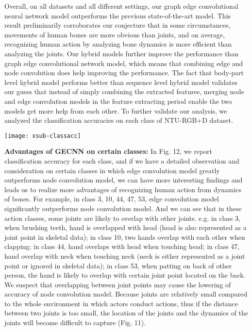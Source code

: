 \documentclass[a4paper,11pt]{article}
\begin{document}
Overall, on all datasets and all different settings, our graph edge convolutional neural network model outperforms the previous state-of-the-art model.
This result preliminarily corroborates our conjecture that in some circumstances, movements of human bones are more obvious than joints, and on average, recognizing human action by analyzing bone dynamics is more efficient than analyzing the joints. Our hybrid models further improve the performance than graph edge convolutional network model, which means that combining edge and node convolution does help improving the performance. The fact that body-part level hybrid model performs better than sequence level hybrid model validates our guess that instead of simply combining the extracted features, merging node and edge convolution models in the feature extracting period enable the two models get more help from each other.
To further validate our analysis, we analyzed the classification accuracies on each class of NTU-RGB+D dataset.

\begin{figure*}
\centering
\texttt{[image: xsub-classacc]}
\caption{Class accuracy on NTU-RGB+D dataset with cross-subject separation. For each class, we represent the accuracies of four models with bars in four different colors. We only provide the number denoting each class, for detailed name of each class, please refer to \href{https://github.com/shahroudy/NTURGB-D}{NTU-RGB+D}}
\label{fig:example}
\end{figure*}



{\bf Advantages of GECNN on certain classes:}
In Fig. 12, we report classification accuracy for each class, and if we have a detailed observation and consideration on certain classes in which edge convolution model greatly outperforms node convolution model, we can have more interesting findings and leads us to realize more advantages of recognizing human action from dynamics of bones. For example, in class 3, 10, 44, 47, 53, edge convolution model significantly outperforms node convolution model. And we can see that in these action classes, some joints are likely to overlap with other joints. e.g. in class 3, when brushing teeth, hand is overlapped with head (head is also represented as a joint point in skeletal data); in class 10, two hands overlap with each other when clapping; in class 44, hand overlaps with head when touching head; in class 47, hand overlap with neck when touching neck (neck is either represented as a joint point or ignored in skeletal data); in class 53, when patting on back of other person, the hand is likely to overlap with certain joint point located on the back. We suspect that overlapping between joint points may cause the lowering of accuracy of node convolution model. Because joints are relatively small compared to the whole environment in which actors conduct actions, thus if the distance between two joints is too small, the location of the joints and the dynamics of the joints will become difficult to capture (Fig. 11).
\end{document}
